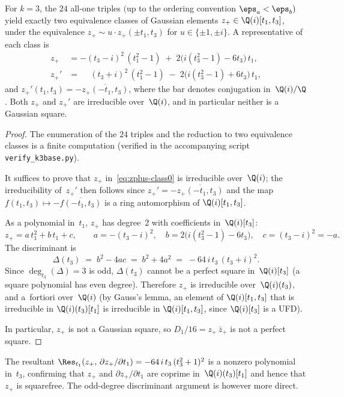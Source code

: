 
\begin{lemma}\label{lem:k3base}
For $k=3$, the $24$ all-one triples $($up to the ordering
convention $\eps_a < \eps_b)$ yield exactly two equivalence classes
of Gaussian elements $z_+ \in \Q(i)[t_1, t_3]$, under the equivalence
$z_+ \sim u \cdot z_+({\pm t_1, t_3})$ for $u \in \{{\pm 1, \pm i}\}$.
A representative of each class is
\begin{align}
  z_+ &= -(t_3 - i)^2\,(t_1^2 - 1)
         \;+\; 2\bigl(i(t_3^2 - 1) - 6t_3\bigr)\,t_1,
         \label{eq:zplus-class0} \\
  z_+' &= \phantom{-}(t_3 + i)^2\,(t_1^2 - 1)
         \;-\; 2\bigl(i(t_3^2 - 1) + 6t_3\bigr)\,t_1,
         \label{eq:zplus-class1}
\end{align}
and $z_+'(t_1, t_3) = -\overline{z_+(-t_1, t_3)}$,
where the bar denotes conjugation in~$\Q(i)/\Q$.
Both $z_+$ and $z_+'$ are irreducible over~$\Q(i)$, and in particular
neither is a Gaussian square.
\end{lemma}

\begin{proof}
The enumeration of the $24$ triples and the reduction to two equivalence
classes is a finite computation (verified in the accompanying script
\texttt{verify\_k3base.py}).

It suffices to prove that $z_+$ in~\eqref{eq:zplus-class0} is irreducible
over~$\Q(i)$; the irreducibility of~$z_+'$ then follows since
$z_+' = -\overline{z_+(-t_1, t_3)}$ and the map
$f(t_1, t_3) \mapsto -\overline{f(-t_1, t_3)}$ is a ring automorphism
of $\Q(i)[t_1, t_3]$.

As a polynomial in~$t_1$, $z_+$ has degree~$2$ with coefficients
in~$\Q(i)[t_3]$:
\[
  z_+ = a\,t_1^2 + b\,t_1 + c, \qquad
  a = -(t_3 - i)^2, \quad
  b = 2\bigl(i(t_3^2-1) - 6t_3\bigr), \quad
  c = (t_3 - i)^2 = -a.
\]
The discriminant is
\[
  \Delta(t_3) \;=\; b^2 - 4ac \;=\; b^2 + 4a^2 \;=\; -64\,i\,t_3\,(t_3 + i)^2.
\]
Since $\deg_{t_3}(\Delta) = 3$ is odd, $\Delta(t_3)$ cannot be a perfect
square in~$\Q(i)[t_3]$ (a square polynomial has even degree).
Therefore $z_+$ is irreducible over~$\Q(i)(t_3)$, and a~fortiori
over~$\Q(i)$ (by Gauss's lemma, an element of $\Q(i)[t_1, t_3]$ that is
irreducible in $\Q(i)(t_3)[t_1]$ is irreducible in $\Q(i)[t_1, t_3]$,
since $\Q(i)[t_3]$ is a UFD).

In particular, $z_+$ is not a Gaussian square, so
$D_1/16 = z_+\,\bar{z}_+$ is not a perfect square.
\end{proof}

\begin{remark}
The resultant $\Res_{t_1}(z_+,\, \partial z_+/\partial t_1)
= -64\,i\,t_3\,(t_3^2+1)^2$
is a nonzero polynomial in~$t_3$, confirming that $z_+$ and
$\partial z_+/\partial t_1$ are coprime in~$\Q(i)(t_3)[t_1]$
and hence that $z_+$ is squarefree.
The odd-degree discriminant argument is however more direct.
\end{remark}
